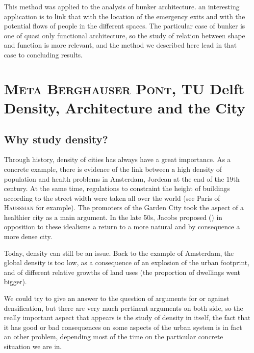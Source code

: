 \documentclass[english]{article}
\newcommand{\noun}[1]{\textsc{#1}}
\begin{document}
This method was applied to the analysis of bunker architecture. an
interesting application is to link that with the location of the emergency
exits and with the potential flows of people in the different spaces.
The particular case of bunker is one of quasi only functional architecture,
so the study of relation between shape and function is more relevant,
and the method we described here lead in that case to concluding results.

\newpage{}


\section*{\noun{Meta Berghauser Pont}, TU Delft\protect \\
Density, Architecture and the City}


\subsection*{Why study density?}

Through history, density of cities has always have a great importance.
As a concrete example, there is evidence of the link between a high
density of population and health problems in Ansterdam, Jordean at
the end of the 19th century. At the same time, regulations to constraint
the height of buildings according to the street width were taken all
over the world (see Paris of \noun{Haussman} for example). The promoters
of the Garden City took the aspect of a healthier city as a main argument.
In the late 50s, Jacobs proposed (\cite{Jac56}) in opposition to
these idealisms a return to a more natural and by consequence a more
dense city.

\bigskip{}


Today, density can still be an issue. Back to the example of Amsterdam,
the global density is too low, as a consequence of an explosion of
the urban footprint, and of different relative growths of land uses
(the proportion of dwellings went bigger).

\bigskip{}


We could try to give an answer to the question of arguments for or
against densification, but there are very much pertinent arguments
on both side, so the really important aspect that appears is the study
of density in itself, the fact that it has good or bad consequences
on some aspects of the urban system is in fact an other problem, depending
most of the time on the particular concrete situation we are in.
\end{document}
